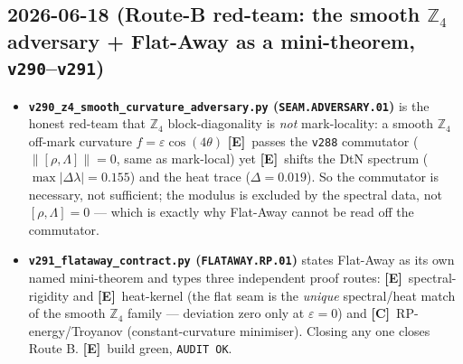 \documentclass[11pt]{article}
\providecommand{\mE}{\textbf{[E]}}\providecommand{\mC}{\textbf{[C]}}
\providecommand{\vref}[1]{\texttt{#1}}
\begin{document}
\subsection*{2026-06-18 (Route-B red-team: the smooth $\mathbb{Z}_4$ adversary + Flat-Away as a mini-theorem, \texttt{v290}--\texttt{v291})}
\begin{itemize}
\item \textbf{\texttt{v290\_z4\_smooth\_curvature\_adversary.py} (\texttt{SEAM.ADVERSARY.01})} is the honest
  red-team that $\mathbb{Z}_4$ block-diagonality is \emph{not} mark-locality: a smooth $\mathbb{Z}_4$
  off-mark curvature $f=\varepsilon\cos(4\theta)$ \mE\ passes the \vref{v288} commutator
  ($\|[\rho,\Lambda]\|=0$, same as mark-local) yet \mE\ shifts the DtN spectrum ($\max|\Delta\lambda|=0.155$)
  and the heat trace ($\Delta=0.019$). So the commutator is necessary, not sufficient; the modulus is
  excluded by the spectral data, not $[\rho,\Lambda]{=}0$ --- which is exactly why Flat-Away cannot be
  read off the commutator.
\item \textbf{\texttt{v291\_flataway\_contract.py} (\texttt{FLATAWAY.RP.01})} states Flat-Away as its own
  named mini-theorem and types three independent proof routes: \mE\ spectral-rigidity and \mE\ heat-kernel
  (the flat seam is the \emph{unique} spectral/heat match of the smooth $\mathbb{Z}_4$ family --- deviation
  zero only at $\varepsilon{=}0$) and \mC\ RP-energy/Troyanov (constant-curvature minimiser). Closing any one
  closes Route B. \mE\ build green, \texttt{AUDIT OK}.
\end{itemize}
\end{document}

